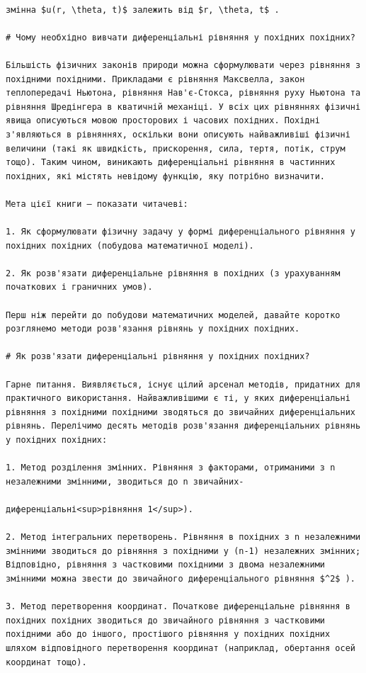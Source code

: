 \documentclass[
  ukrainian,
]{article}
\begin{document}
\begin{verbatim}

змінна $u(r, \theta, t)$ залежить від $r, \theta, t$ .

# Чому необхідно вивчати диференціальні рівняння у похідних похідних?

Більшість фізичних законів природи можна сформулювати через рівняння з похідними похідними. Прикладами є рівняння Максвелла, закон теплопередачі Ньютона, рівняння Нав'є-Стокса, рівняння руху Ньютона та рівняння Шредінгера в кватичній механіці. У всіх цих рівняннях фізичні явища описуються мовою просторових і часових похідних. Похідні з'являються в рівняннях, оскільки вони описують найважливіші фізичні величини (такі як швидкість, прискорення, сила, тертя, потік, струм тощо). Таким чином, виникають диференціальні рівняння в частинних похідних, які містять невідому функцію, яку потрібно визначити.

Мета цієї книги — показати читачеві:

1. Як сформулювати фізичну задачу у формі диференціального рівняння у похідних похідних (побудова математичної моделі).

2. Як розв'язати диференціальне рівняння в похідних (з урахуванням початкових і граничних умов).

Перш ніж перейти до побудови математичних моделей, давайте коротко розглянемо методи розв'язання рівнянь у похідних похідних.

# Як розв'язати диференціальні рівняння у похідних похідних?

Гарне питання. Виявляється, існує цілий арсенал методів, придатних для практичного використання. Найважливішими є ті, у яких диференціальні рівняння з похідними похідними зводяться до звичайних диференціальних рівнянь. Перелічимо десять методів розв'язання диференціальних рівнянь у похідних похідних:

1. Метод розділення змінних. Рівняння з факторами, отриманими з n незалежними змінними, зводиться до n звичайних-

диференціальні<sup>рівняння 1</sup>).

2. Метод інтегральних перетворень. Рівняння в похідних з n незалежними змінними зводиться до рівняння з похідними у (n-1) незалежних змінних; Відповідно, рівняння з частковими похідними з двома незалежними змінними можна звести до звичайного диференціального рівняння $^2$ ).

3. Метод перетворення координат. Початкове диференціальне рівняння в похідних похідних зводиться до звичайного рівняння з частковими похідними або до іншого, простішого рівняння у похідних похідних шляхом відповідного перетворення координат (наприклад, обертання осей координат тощо).


\end{verbatim}
\end{document}
